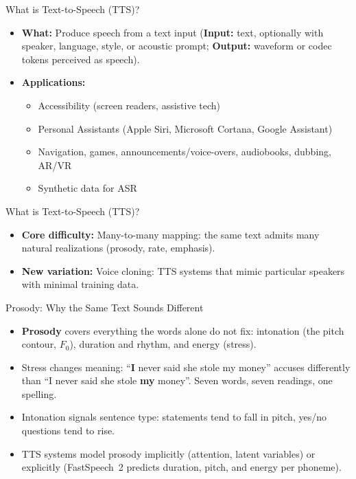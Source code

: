 \begin{frame}{What is Text-to-Speech (TTS)?}
  \begin{itemize}
    \item \textbf{What:} Produce speech from a text input (\textbf{Input:} text, optionally with speaker, language, style, or acoustic prompt; \textbf{Output:} waveform or codec tokens perceived as speech).
    \item \textbf{Applications:}
      \begin{itemize}
        \item Accessibility (screen readers, assistive tech)
        \item Personal Assistants (Apple Siri, Microsoft Cortana, Google Assistant)
        \item Navigation, games, announcements/voice-overs, audiobooks, dubbing, AR/VR
        \item Synthetic data for ASR
      \end{itemize}
    \end{itemize}
\end{frame}

\begin{frame}{What is Text-to-Speech (TTS)?}
  \begin{itemize}
    \item \textbf{Core difficulty:} Many-to-many mapping: the same text admits many natural realizations (prosody, rate, emphasis).
    \item \textbf{New variation:} Voice cloning: TTS systems that mimic particular speakers with minimal training data.
  \end{itemize}
\end{frame}

\begin{frame}{Prosody: Why the Same Text Sounds Different}
  \begin{itemize}
    \item \textbf{Prosody} covers everything the words alone do not fix: intonation (the pitch contour, $F_0$), duration and rhythm, and energy (stress).
    \item Stress changes meaning: ``\textbf{I} never said she stole my money'' accuses differently than ``I never said she stole \textbf{my} money''. Seven words, seven readings, one spelling.
    \item Intonation signals sentence type: statements tend to fall in pitch, yes/no questions tend to rise.
    \item TTS systems model prosody implicitly (attention, latent variables) or explicitly (FastSpeech~2 predicts duration, pitch, and energy per phoneme).
  \end{itemize}
\end{frame}


